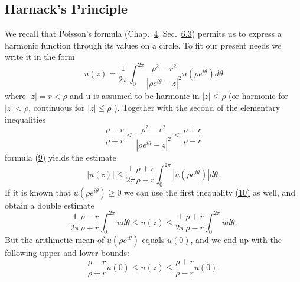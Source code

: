 \setcounter{section}{3}\setcounter{subsection}{1}\subsection{Harnack's Principle}\label{sec:6.3.2}
We recall that Poisson's formula (Chap.~\hyperref[chap:4]{4}, Sec.~\hyperref[sec:4.6.3]{6.3}) permits us to express a harmonic function through its values on a circle. To fit our present needs we write it in the form
\begin{equation*}
u (z) = \frac {1}{2 \pi} \int_ {0} ^ {2 \pi} \frac {\rho^ {2} - r ^ {2}}{| \rho e ^ {i \theta} - z | ^ {2}} u (\rho e ^ {i \theta}) d \theta\tag{9}\label{eq:6.9}
\end{equation*}
where $|z| = r < \rho$ and u is assumed to be harmonic in $|z| \leq \rho$ (or harmonic for $|z| < \rho$, continuous for $|z| \leq \rho$ ). Together with the second of the elementary inequalities
\begin{equation*}
\frac {\rho - r}{\rho + r} \leq \frac {\rho^ {2} - r ^ {2}}{| \rho e ^ {i \theta} - z | ^ {2}} \leq \frac {\rho + r}{\rho - r}\tag{10}\label{eq:6.10}
\end{equation*}
formula \hyperref[eq:6.9]{(9)} yields the estimate
\begin{equation*}
| u (z) | \leq \frac {1}{2 \pi} \frac {\rho + r}{\rho - r} \int_ {0} ^ {2 \pi} | u (\rho e ^ {i \theta}) | d \theta .
\end{equation*}
If it is known that $u(\rho e^{i\theta}) \geq 0$ we can use the first inequality \hyperref[eq:6.10]{(10)} as well, and obtain a double estimate
\begin{equation*}
\frac {1}{2 \pi} \frac {\rho - r}{\rho + r} \int_ {0} ^ {2 \pi} u d \theta \leq u (z) \leq \frac {1}{2 \pi} \frac {\rho + r}{\rho - r} \int_ {0} ^ {2 \pi} u d \theta .
\end{equation*}
But the arithmetic mean of $u(\rho e^{i\theta})$ equals $u(0)$, and we end up with the following upper and lower bounds:
\begin{equation*}
\frac {\rho - r}{\rho + r} u (0) \leq u (z) \leq \frac {\rho + r}{\rho - r} u (0).\tag{11}\label{eq:6.11}
\end{equation*}
\begingroup\renewcommand{\thefootnote}{}\endgroup

